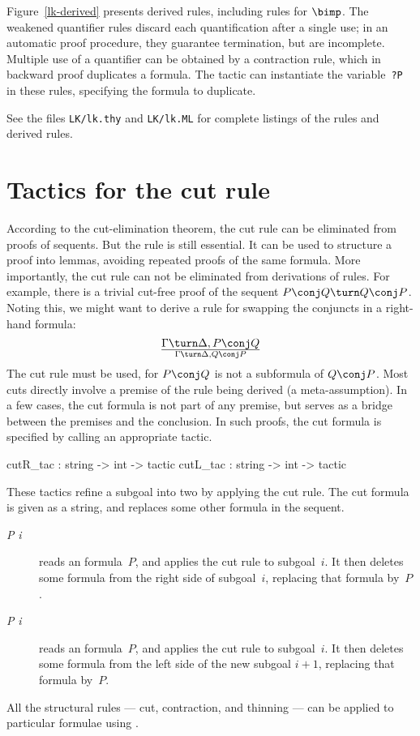 Figure~\ref{lk-derived} presents derived rules, including rules for
$\bimp$.  The weakened quantifier rules discard each quantification after a
single use; in an automatic proof procedure, they guarantee termination,
but are incomplete.  Multiple use of a quantifier can be obtained by a
contraction rule, which in backward proof duplicates a formula.  The tactic
 can instantiate the variable~{\tt?P} in these rules,
specifying the formula to duplicate.

See the files {\tt LK/lk.thy} and {\tt LK/lk.ML}
for complete listings of the rules and derived rules.


\section{Tactics for the cut rule}
According to the cut-elimination theorem, the cut rule can be eliminated
from proofs of sequents.  But the rule is still essential.  It can be used
to structure a proof into lemmas, avoiding repeated proofs of the same
formula.  More importantly, the cut rule can not be eliminated from
derivations of rules.  For example, there is a trivial cut-free proof of
the sequent \(P\conj Q\turn Q\conj P\).
Noting this, we might want to derive a rule for swapping the conjuncts
in a right-hand formula:
\[ \Gamma\turn \Delta, P\conj Q\over \Gamma\turn \Delta, Q\conj P \]
The cut rule must be used, for $P\conj Q$ is not a subformula of $Q\conj
P$.  Most cuts directly involve a premise of the rule being derived (a
meta-assumption).  In a few cases, the cut formula is not part of any
premise, but serves as a bridge between the premises and the conclusion.
In such proofs, the cut formula is specified by calling an appropriate
tactic.

\begin{ttbox} 
cutR_tac : string -> int -> tactic
cutL_tac : string -> int -> tactic
\end{ttbox}
These tactics refine a subgoal into two by applying the cut rule.  The cut
formula is given as a string, and replaces some other formula in the sequent.
\begin{description}
\item[ {\it P\/} {\it i}] 
reads an \LK{} formula~$P$, and applies the cut rule to subgoal~$i$.  It
then deletes some formula from the right side of subgoal~$i$, replacing
that formula by~$P$.

\item[ {\it P\/} {\it i}] 
reads an \LK{} formula~$P$, and applies the cut rule to subgoal~$i$.  It
then deletes some formula from the left side of the new subgoal $i+1$,
replacing that formula by~$P$.
\end{description}
All the structural rules --- cut, contraction, and thinning --- can be
applied to particular formulae using .


